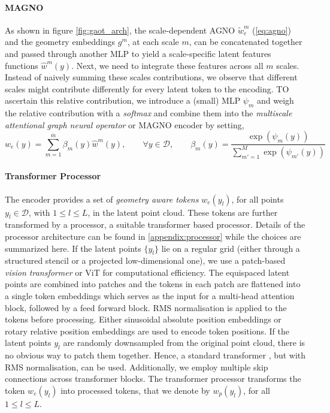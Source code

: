 \documentclass[reqno,10pt]{amsart}
\theoremstyle{plain}
\theoremstyle{definition}
\newcommand{\cal}[1]{\mathcal{#1}}
\begin{document}
\paragraph{\bf MAGNO} 
As shown in figure \ref{fig:gaot_arch}, the scale-dependent AGNO $\tilde{w}^m_e$ (\ref{eq:agno}) and the geometry embeddings $g^m$, at each scale $m$, can be concatenated together and passed through another MLP to yield a scale-specific latent features functions $\hat{w}^m(y)$. Next, we need to integrate these features across all $m$ scales. Instead of naively summing these scales contributions, we observe that different scales might contribute differently for every latent token to the encoding. TO ascertain this relative contribution, we introduce a (small) MLP $\psi_m$ and weigh the relative contribution with a {\it softmax} and combine them into the {\it multiscale attentional graph neural operator} or MAGNO encoder by setting,
\begin{equation}\label{eq:atten_fusion}
    w_e(y) = \sum_{m=1}^{\bar{m}} \beta_m(y) \hat{w}^m(y), \qquad \forall y \in \cal D, \qquad \beta_m(y) = \frac{\exp(\psi_m(y))}{\sum_{m'=1}^{M}\exp(\psi_{m'}(y))}
\end{equation}

\paragraph{\bf Transformer Processor}
The encoder provides a set of {\it geometry aware tokens} $w_e(y_l)$, for all points $y_l \in \cal D$, with $1 \leq l \leq L$, in the latent point cloud. These tokens are further transformed by a processor, a suitable transformer based processor. Details of the processor architecture can be found in \ref{appendix:processor} while the choices are summarized here. If the latent points $\{y_l\}$ lie on a regular grid (either through a structured stencil or a projected low-dimensional one), we use a patch-based {\it vision transformer} or ViT \cite{AD2021} for computational efficiency. The equispaced latent points are combined into patches and the tokens in each patch are flattened into a single token embeddings which serves as the input for a multi-head attention block, followed by a feed forward block. RMS normalisation is applied to the tokens before processing. Either sinusoidal absolute position embeddings or rotary relative position embeddings are used to encode token positions. If the latent points $y_l$ are randomly downsampled from the original point cloud, there is no obvious way to patch them together. Hence, a standard transformer \cite{AV2017}, but with RMS normalisation, can be used. Additionally, we employ multiple skip connections across transformer blocks. The transformer processor transforms the token $w_e(y_l)$ into processed tokens, that we denote by $w_p(y_l)$, for all $ 1 \leq l \leq L$.
\end{document}
